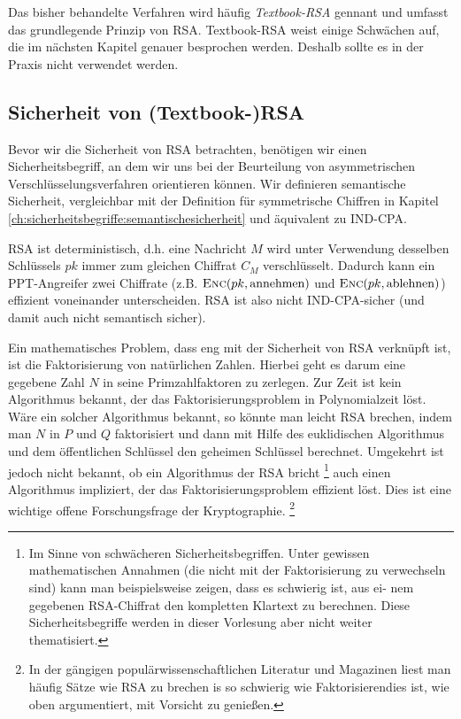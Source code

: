 Das bisher behandelte Verfahren wird häufig \textit{Textbook-RSA} gennant und
umfasst das grundlegende Prinzip von RSA. Textbook-RSA weist einige
Schwächen auf, die im nächsten Kapitel genauer besprochen
werden. Deshalb sollte es in der Praxis nicht verwendet werden.

\subsection{Sicherheit von (Textbook-)RSA}
\label{ch:asymmenc:rsa:sicherheit}
Bevor wir die Sicherheit von RSA betrachten, benötigen wir einen Sicherheitsbegriff, an dem wir uns bei der Beurteilung von asymmetrischen
Verschlüsselungsverfahren orientieren können. Wir definieren semantische
Sicherheit, vergleichbar mit der Definition für symmetrische Chiffren in
Kapitel \ref{ch:sicherheitsbegriffe:semantischesicherheit} und
äquivalent zu IND-CPA. 

RSA ist deterministisch, d.h. eine Nachricht $M$ wird unter Verwendung
desselben Schlüssels $pk$ immer zum gleichen Chiffrat $C_M$
verschlüsselt. Dadurch kann ein PPT-Angreifer zwei Chiffrate (z.B. $\textsc{Enc}(pk, \text{annehmen})$ und $\textsc{Enc}(pk,
\text{ablehnen})$) effizient voneinander
unterscheiden. RSA ist also nicht IND-CPA-sicher (und damit auch
nicht semantisch sicher). 

Ein mathematisches Problem, dass eng mit der Sicherheit von RSA
verknüpft ist, ist die Faktorisierung von natürlichen Zahlen. Hierbei
geht es darum eine gegebene Zahl $N$ in seine Primzahlfaktoren zu
zerlegen. Zur Zeit ist kein Algorithmus bekannt, der das
Faktorisierungsproblem in Polynomialzeit löst. Wäre ein solcher
Algorithmus bekannt, so könnte man leicht RSA \glqq brechen\grqq , indem
man $N$ in $P$ und $Q$ faktorisiert und dann mit Hilfe des euklidischen
Algorithmus und dem öffentlichen Schlüssel den geheimen Schlüssel
berechnet. Umgekehrt ist jedoch nicht bekannt, ob ein Algorithmus der
RSA bricht \footnote{Im Sinne von schwächeren
Sicherheitsbegriffen. Unter gewissen mathematischen Annahmen (die nicht
mit der Faktorisierung zu verwechseln sind) kann man beispielsweise
zeigen, dass es schwierig ist, aus ei- nem gegebenen RSA-Chiffrat den
kompletten Klartext zu berechnen. Diese Sicherheitsbegriffe werden in
dieser Vorlesung aber nicht weiter thematisiert.} auch einen Algorithmus
impliziert, der das Faktorisierungsproblem effizient löst. Dies ist eine
wichtige offene Forschungsfrage der Kryptographie. \footnote{In der
gängigen populärwissenschaftlichen Literatur und Magazinen liest man
häufig Sätze wie \glqq RSA zu brechen is so schwierig wie
Faktorisieren\grqq dies ist, wie oben argumentiert, mit Vorsicht zu
genießen.}

